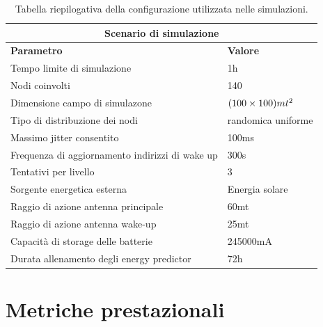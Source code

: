 \documentclass[binding=0.6cm,TFA]{sapthesis}
\begin{document}
\begin{table}[hb]
    \setlength\doublerulesep{1mm} 
    \centering
    \caption{Tabella riepilogativa della configurazione utilizzata nelle simulazioni.}
    \begin{tabular}{ |p{8cm}|p{4cm}|  }
        \hline
        \multicolumn{2}{|c|}{\textbf{Scenario di simulazione}}                                      \\
        \hline \hline
        \textbf{Parametro}                              & \textbf{Valore}                           \\
        \hline
        Tempo limite di simulazione                     & 1h                                       \\
        Nodi coinvolti                                  & 140                                       \\
        Dimensione campo di simulazone                  & $(100 \times 100) mt\textsuperscript{2}$  \\
        Tipo di distribuzione dei nodi                  & randomica uniforme                        \\
        Massimo jitter consentito                       & 100ms                                     \\
        Frequenza di aggiornamento indirizzi di wake up & 300s                                      \\
        Tentativi per livello                           & 3                                         \\
        Sorgente energetica esterna                     & Energia solare                            \\
        Raggio di azione antenna principale             & 60mt                                      \\
        Raggio di azione antenna wake-up                & 25mt                                      \\
        Capacità di storage delle batterie              & 245000mA                                  \\
        Durata allenamento degli energy predictor       & 72h                                       \\
        \hline
    \end{tabular}
\end{table}

\section{Metriche prestazionali}
\end{document}
